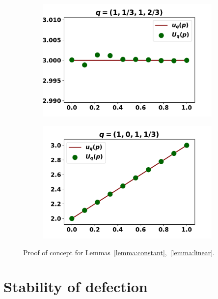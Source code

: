 \documentclass[10pt]{article}
\begin{document}
\begin{figure}[!htbp]
    \begin{center}
        \begin{subfigure}{0.45\textwidth}
            \includegraphics[width=\linewidth]{img/constant}
        \end{subfigure}
        \begin{subfigure}{0.45\textwidth}
            \includegraphics[width=\linewidth]{img/linear}
        \end{subfigure}
    \end{center}
    \caption{Proof of concept for Lemmas~\ref{lemma:constant},~\ref{lemma:linear}.}
    \label{fig:purely_lemmas}
\end{figure}

\section{Stability of defection}
\end{document}
